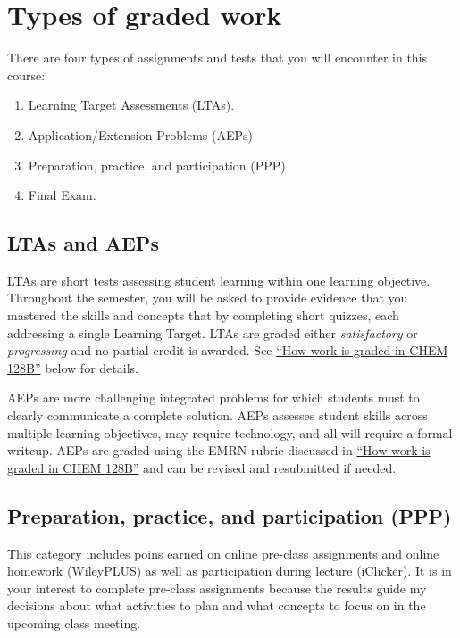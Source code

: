 \hypertarget{types-of-graded-work}{%
\section{Types of graded work}\label{types-of-graded-work}}

There are four types of assignments and tests that you will encounter in
this course:

\begin{enumerate}
\def\labelenumi{\arabic{enumi}.}
\tightlist
\item
  Learning Target Assessments (LTAs).\\
\item
  Application/Extension Problems (AEPs)
\item
  Preparation, practice, and participation (PPP)
\item
  Final Exam.
\end{enumerate}

\hypertarget{ltas-and-aeps}{%
\subsection{LTAs and AEPs}\label{ltas-and-aeps}}

LTAs are short tests assessing student learning within one learning
objective. Throughout the semester, you will be asked to provide
evidence that you mastered the skills and concepts that by completing
short quizzes, each addressing a single Learning Target. LTAs are graded
either \emph{satisfactory} or \emph{progressing} and no partial credit
is awarded. See \protect\hyperlink{grading}{``How work is graded in CHEM
128B''} below for details.

AEPs are more challenging integrated problems for which students must to
clearly communicate a complete solution. AEPs assesses student skills
across multiple learning objectives, may require technology, and all
will require a formal writeup. AEPs are graded using the EMRN rubric
discussed in \protect\hyperlink{grading}{``How work is graded in CHEM
128B''} and can be revised and resubmitted if needed.

\hypertarget{preparation-practice-and-participation-ppp}{%
\subsection{Preparation, practice, and participation
(PPP)}\label{preparation-practice-and-participation-ppp}}

This category includes poins earned on online pre-class assignments and
online homework (WileyPLUS) as well as participation during lecture
(iClicker). It is in your interest to complete pre-class assignments
because the results guide my decisions about what activities to plan and
what concepts to focus on in the upcoming class meeting.

